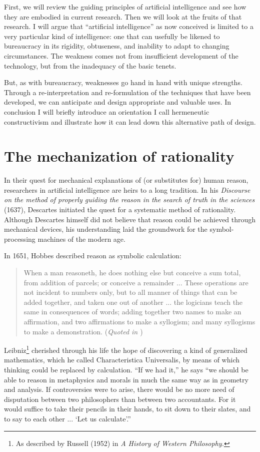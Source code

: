 \documentclass[12pt]{article}
\begin{document}
First, we will review the guiding principles of artificial intelligence and see how they are embodied in current research. Then we will look at the fruits of that research. I will argue that ``artificial intelligence'' as now conceived is limited to a very particular kind of intelligence: one that can usefully be likened to bureaucracy in its rigidity, obtuseness, and inability to adapt to changing circumstances. The weakness comes not from insufficient development of the technology, but from the inadequacy of the basic tenets.

But, as with bureaucracy, weaknesses go hand in hand with unique strengths. Through a re-interpretation and re-formulation of the techniques that have been developed, we can anticipate and design appropriate and valuable uses. In conclusion I will briefly introduce an orientation I call hermeneutic constructivism and illustrate how it can lead down this alternative path of design.

\section{The mechanization of rationality}

In their quest for mechanical explanations of (or substitutes for) human reason, researchers in artificial intelligence are heirs to a long tradition. In his {\it Discourse on the method of properly guiding the reason in the search of truth in the sciences} (1637), Descartes initiated the quest for a systematic method of rationality. Although Descartes himself did not believe that reason could be achieved through mechanical devices, his understanding laid the groundwork for the symbol-processing machines of the modern age.

In 1651, Hobbes described reason as symbolic calculation:

\begin{quote}
When a man reasoneth, he does nothing else but conceive a sum total, from addition of parcels; or conceive a remainder ... These operations are not incident to numbers only, but to all manner of things that can be added together, and taken one out of another ... the logicians teach the same in consequences of words; adding together two names to make an affirmation, and two affirmations to make a syllogism; and many syllogisms to make a demonstration. ({\it Quoted in \cite{haugeland1985}})
\end{quote}

\noindent
Leibniz\footnote{As described by Russell (1952) in {\it A History of Western Philosophy.}} cherished through his life the hope of discovering a kind of generalized mathematics, which he called Characteristica Universalis, by means of which thinking could be replaced by calculation. ``If we had it,'' he says ``we should be able to reason in metaphysics and morals in much the same way as in geometry and analysis. If controversies were to arise, there would be no more need of disputation between two philosophers than between two accountants. For it would suffice to take their pencils in their hands, to sit down to their slates, and to say to each other ... `Let us calculate'.''
\end{document}
